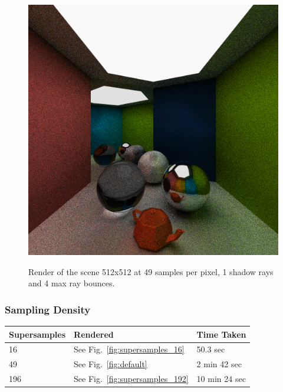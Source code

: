 \documentclass[a4paper, twocolumn]{article}
\begin{document}
            \begin{figure}[H]
                \centering
                \caption{Render of the scene 512x512 at 49 samples per pixel, 1 shadow rays and 4 max ray bounces.}
                \includegraphics[width=0.8\linewidth]{share/results/bounce_rays_4.png}
                \label{fig:bounce_rays_4}
            \end{figure}

            \subsubsection*{Sampling Density}

            \begin{table}[H]
            \centering
            \begin{tabular}{lll}
                \toprule
                \textbf{Supersamples}&\textbf{Rendered}&\textbf{Time Taken}\\
                \midrule
                16&See Fig.~\ref{fig:supersamples_16}&50.3 sec\\
                49&See Fig.~\ref{fig:default}&2 min 42 sec\\
                196&See Fig.~\ref{fig:supersamples_192}&10 min 24 sec\\
                \bottomrule
            \end{tabular}
            \label{tab:shadow_rays}
            \end{table}
\end{document}
